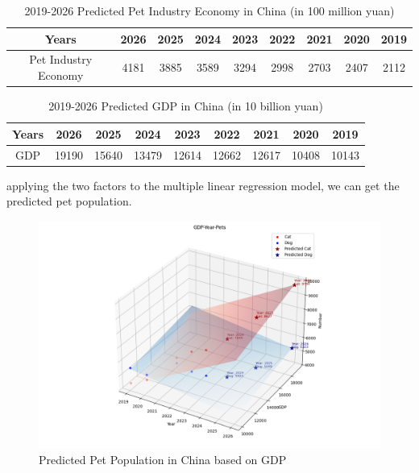 \documentclass[withoutpreface,bwprint]{cumcmthesis} %
\begin{document}
\begin{table}[!htbp]
    \caption{2019-2026 Predicted Pet Industry Economy in China (in 100 million yuan)} \centering
    \begin{tabular}{ccccccccc}
    \toprule[1.5pt]
    Years & 2026 & 2025 & 2024 & 2023 & 2022 & 2021 & 2020 & 2019 \\
    \midrule[1pt]
    Pet Industry Economy & 4181 & 3885 & 3589 & 3294 & 2998 & 2703 & 2407 & 2112 \\
    \bottomrule[1.5pt]
    \end{tabular}
\end{table}
\begin{table}[!htbp]
    \caption{2019-2026 Predicted GDP in China (in 10 billion yuan)} \centering
    \begin{tabular}{ccccccccc}
    \toprule[1.5pt]
    Years & 2026 & 2025 & 2024 & 2023 & 2022 & 2021 & 2020 & 2019 \\
    \midrule[1pt]
    GDP & 19190 & 15640 & 13479 & 12614 & 12662 & 12617 & 10408 & 10143 \\
    \bottomrule[1.5pt]
    \end{tabular}
\end{table}
\par applying the two factors to the multiple linear regression model,
we can get the predicted pet population.
\begin{figure}[htbp]
	\centering
	\includegraphics[width=.99\textwidth]{Figure_11}
	\caption{Predicted Pet Population in China based on GDP}
\end{figure}
\end{document}
